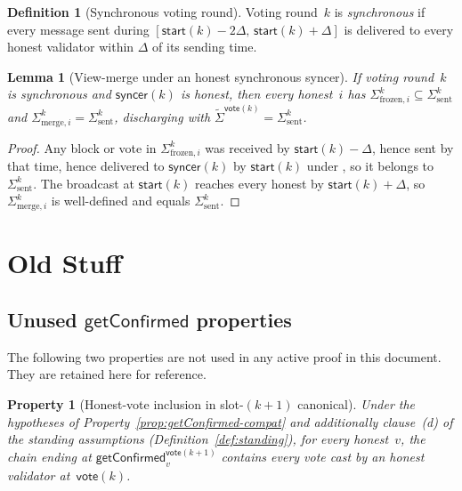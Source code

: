 \ifx\litemode\undefined\documentclass{article}\fi
\newcommand{\start}{\ensuremath{\mathsf{start}}}
\newcommand{\vote}{\ensuremath{\mathsf{vote}}}
\newcommand{\comm}[1]{\ensuremath{\widetilde{#1}}}
\newcommand{\syncer}{\textsf{syncer}\xspace}
\newcommand{\getConfirmed}{\textsf{getConfirmed}\xspace}
\theoremstyle{plain}
\newtheorem{lemma}{Lemma}
\newtheorem{property}[theorem]{Property}
\theoremstyle{definition}
\newtheorem{definition}{Definition}
\theoremstyle{remark}
\begin{document}
\begin{definition}[Synchronous voting round]\label{def:synchrony-window}
Voting round~$k$ is \emph{synchronous} if every message sent during $[\start(k) - 2\Delta,\, \start(k) + \Delta]$ is delivered to every honest validator within $\Delta$ of its sending time.
\end{definition}

\begin{lemma}[View-merge under an honest synchronous syncer]\label{lem:view-merge}
If voting round~$k$ is synchronous and $\syncer(k)$ is honest, then every honest~$i$ has $\Sigma^k_{\mathrm{frozen},i} \subseteq \Sigma^k_{\mathrm{sent}}$ and $\Sigma^k_{\mathrm{merge},i} = \Sigma^k_{\mathrm{sent}}$, discharging  with $\comm{\Sigma}^{\vote(k)} = \Sigma^k_{\mathrm{sent}}$.
\end{lemma}

\begin{proof}
Any block or vote in $\Sigma^k_{\mathrm{frozen},i}$ was received by $\start(k) - \Delta$, hence sent by that time, hence delivered to $\syncer(k)$ by $\start(k)$ under , so it belongs to $\Sigma^k_{\mathrm{sent}}$.
The broadcast at $\start(k)$ reaches every honest by $\start(k) + \Delta$, so $\Sigma^k_{\mathrm{merge},i}$ is well-defined and equals $\Sigma^k_{\mathrm{sent}}$.
\end{proof}

\iffull

\section{Old Stuff}

\subsection{Unused $\getConfirmed$ properties}

The following two properties are not used in any active proof in this document. They are retained here for reference.

\begin{property}[Honest-vote inclusion in slot-$(k{+}1)$ canonical]\label{prop:vote-inclusion}
Under the hypotheses of Property~\ref{prop:getConfirmed-compat} and additionally clause~(d) of the standing assumptions (Definition~\ref{def:standing}), for every honest~$v$, the chain ending at $\getConfirmed_v^{\vote(k+1)}$ contains every vote cast by an honest validator at~$\vote(k)$.
\end{property}
\end{document}
